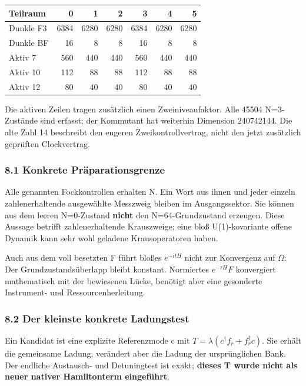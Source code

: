 {\def\LTcaptype{none} %
\begin{longtable}[]{@{}lrrrrrr@{}}
\toprule\noalign{}
Teilraum & 0 & 1 & 2 & 3 & 4 & 5 \\
\midrule\noalign{}
\endhead
\bottomrule\noalign{}
\endlastfoot
Dunkle F3 & 6384 & 6280 & 6280 & 6384 & 6280 & 6280 \\
Dunkle BF & 16 & 8 & 8 & 16 & 8 & 8 \\
Aktiv 7 & 560 & 440 & 440 & 560 & 440 & 440 \\
Aktiv 10 & 112 & 88 & 88 & 112 & 88 & 88 \\
Aktiv 12 & 80 & 40 & 40 & 80 & 40 & 40 \\
\end{longtable}
}

Die aktiven Zeilen tragen zusätzlich einen Zweiniveaufaktor. Alle 45504
N=3-Zustände sind erfasst; der Kommutant hat weiterhin Dimension
240742144. Die alte Zahl 14 beschreibt den engeren Zweikontrollvertrag,
nicht den jetzt zusätzlich geprüften Clockvertrag.

\subsubsection{8.1 Konkrete
Präparationsgrenze}\label{konkrete-pruxe4parationsgrenze}

Alle genannten Fockkontrollen erhalten N. Ein Wort aus ihnen und jeder
einzeln zahlenerhaltende ausgewählte Messzweig bleiben im
Ausgangssektor. Sie können aus dem leeren N=0-Zustand \textbf{nicht} den
N=64-Grundzustand erzeugen. Diese Aussage betrifft zahlenerhaltende
Krauszweige; eine bloß U(1)-kovariante offene Dynamik kann sehr wohl
geladene Krausoperatoren haben.

Auch aus dem voll besetzten F führt bloßes \(e^{-itH}\) nicht zur
Konvergenz auf \(\Omega\): Der Grundzustandsüberlapp bleibt konstant.
Normiertes \(e^{-\tau H}F\) konvergiert mathematisch mit der bewiesenen
Lücke, benötigt aber eine gesonderte Instrument- und
Ressourcenherleitung.

\subsubsection{8.2 Der kleinste konkrete
Ladungstest}\label{der-kleinste-konkrete-ladungstest}

Ein Kandidat ist eine explizite Referenzmode c mit
\(T=\lambda(c^\dagger f_r+f_r^\dagger c)\). Sie erhält die gemeinsame
Ladung, verändert aber die Ladung der ursprünglichen Bank. Der endliche
Austausch- und Detuningtest ist exakt; \textbf{dieses T wurde nicht als
neuer nativer Hamiltonterm eingeführt}.

